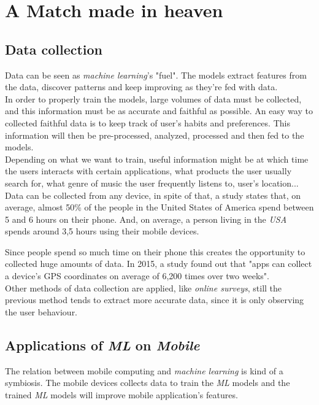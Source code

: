 \documentclass{llncs}
\begin{document}
\section{A Match made in heaven}
\subsection{Data collection}
Data can be seen as \emph{machine learning}'s "fuel". The models extract features from the data, discover patterns and keep improving as they're fed with data.\\

In order to properly train the models, large volumes of data must be collected, and this information must be as accurate and faithful as possible. An easy way to collected faithful data is to keep track of user's habits and preferences. This information will then be pre-processed, analyzed, processed and then fed to the models.\\

Depending on what we want to train, useful information might be at which time the users interacts with certain applications, what products the user usually search for, what genre of music the user frequently listens to, user's location...\\

Data can be collected from any device, in spite of that, a study\cite{statista_mobile_time} states that, on average, almost 50\% of the people in the United States of America spend between 5 and 6 hours on their phone. And, on average, a person living in the \emph{USA} spends around 3,5 hours using their mobile devices.

Since people spend so much time on their phone this creates the opportunity to collected huge amounts of data. In 2015, a study\cite{android_data_collect} found out that "apps can collect a device's GPS coordinates on average of 6,200 times over two weeks".\\

Other methods of data collection are applied, like \emph{online surveys}, still the previous method tends to extract more accurate data, since it is only observing the user behaviour.

\subsection{Applications of \emph{ML} on \emph{Mobile}}

The relation between mobile computing and \emph{machine learning} is kind of a symbiosis. The mobile devices collects data to train the \emph{ML} models and the trained \emph{ML} models will improve mobile application's features.\\
\end{document}
